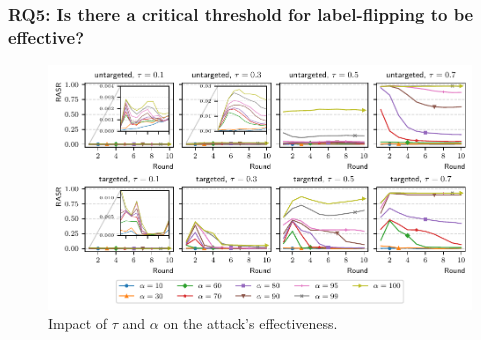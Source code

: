 \documentclass[color,t,presentation,english,aspectratio=169]{beamer}
\begin{document}
\begin{frame}
	\frametitle{RQ5: Is there a critical threshold for label-flipping to be effective?}

	\vspace{-2ex}
	\begin{figure}
		\centering
		\includegraphics[width=.8\textwidth]{figures/attacks.pdf}
		\vspace{-2ex}
		\caption{Impact of $\tau$ and $\alpha$ on the attack's effectiveness.}
	\end{figure}

\end{frame}
	
\end{document}
